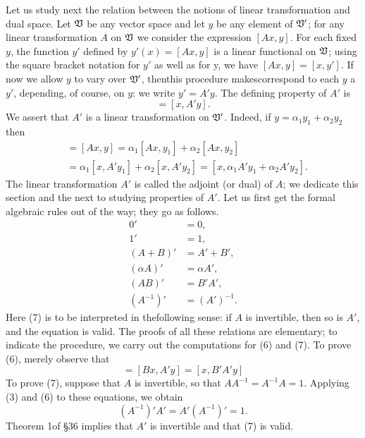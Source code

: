 Let us study next the relation between the notions of linear transformation and
dual space. Let \(\mathfrak{V}\) be any vector space and let \(y\) be any element of
\(\mathfrak{V}'\); for any linear transformation \(A\) on \(\mathfrak{V}\) we consider the
expression \([Ax, y]\). For each fixed \(y\), the function \(y'\) defined by
\(y'(x) = [Ax, y]\) is a linear functional on \(\mathfrak{V}\); using the square
bracket notation for \(y'\) as well as for y, we have \([Ax, y] = [x, y']\). If
now we allow \(y\) to vary over \(\mathfrak{V}'\), thenthis procedure makescorrespond
to each \(y\) a \(y'\), depending, of course, on \(y\): we write \(y' = A'y\).
The defining property of \(A'\) is
\begin{equation}
    [Ax, y] = [x, A'y].
\end{equation}
We assert that \(A'\) is a linear transformation on \(\mathfrak{V}'\). Indeed, if \(y = \alpha_1 y_1 + \alpha_2 y_2\) then
\begin{align*}
    [x, A'y] & = [Ax, y] = \alpha_1[Ax, y_1] + \alpha_2[Ax, y_2] \\
    & = \alpha_1[x, A'y_1] + \alpha_2[x, A'y_2] = [x, \alpha_1 A'y_1 + \alpha_2 A'y_2].
\end{align*}
The linear transformation \(A'\) is called the adjoint (or dual) of \(A\); we
dedicate this section and the next to studying properties of \(A'\). Let us
first get the formal algebraic rules out of the way; they go as follows.
\begin{align}
    0' & = 0, \\
    1' & = 1, \\
    (A + B)' & = A' + B', \\
    (\alpha A)' & = \alpha A', \\
    (AB)' & = B'A', \\
    (A^{-1})' & = (A')^{-1}.
\end{align}
Here (7) is to be interpreted in thefollowing sense: if \(A\) is invertible,
then so is \(A'\), and the equation is valid. The proofs of all these relations
are elementary; to indicate the procedure, we carry out the computations for (6)
and (7). To prove (6), merely observe that
\begin{equation*}
    [ABx, y] = [Bx, A'y] = [x, B'A'y]
\end{equation*}
To prove (7), suppose that \(A\) is invertible, so that \(AA^{-1} = A^{-1}A = 1\). Applying (3) and (6) to these equations, we obtain
\begin{equation*}
    (A^{-1})'A' = A'(A^{-1})' = 1.
\end{equation*}
Theorem 1of §36 implies that \(A'\) is invertible and that (7) is valid.

